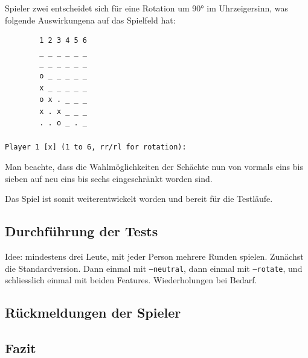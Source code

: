 \documentclass[a4paper,11pt,hidelinks]{scrartcl}
\begin{document}
Spieler zwei entscheidet sich für eine Rotation um 90° im Uhrzeigersinn, was folgende Auswirkungena auf das Spielfeld hat:

\begin{lstlisting}
        1 2 3 4 5 6
        _ _ _ _ _ _
        _ _ _ _ _ _
        o _ _ _ _ _
        x _ _ _ _ _
        o x . _ _ _
        x . x _ _ _
        . . o _ . _

Player 1 [x] (1 to 6, rr/rl for rotation):
\end{lstlisting}

Man beachte, dass die Wahlmöglichkeiten der Schächte nun von vormals eins bis sieben auf neu eins bis sechs eingeschränkt worden sind.

Das Spiel ist somit weiterentwickelt worden und bereit für die Testläufe.

\subsection{Durchführung der Tests}

Idee: mindestens drei Leute, mit jeder Person mehrere Runden spielen. Zunächst die Standardversion. Dann einmal mit \texttt{--neutral}, dann einmal mit \texttt{--rotate}, und schliesslich einmal mit beiden Features. Wiederholungen bei Bedarf.

\subsection{Rückmeldungen der Spieler}

\subsection{Fazit}

\newpage

\listoffigures
{}
\end{document}
